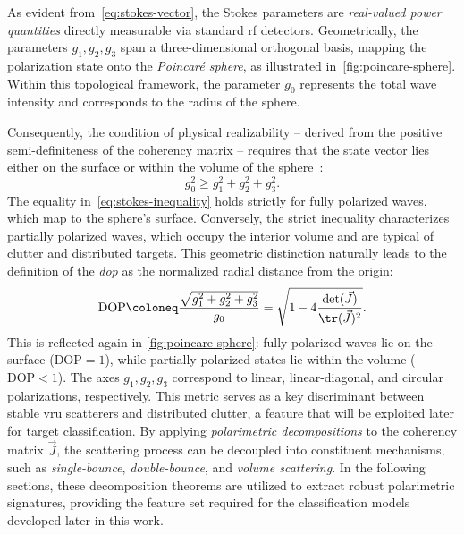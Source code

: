As evident from~\cref{eq:stokes-vector}, the Stokes parameters are \emph{real-valued power quantities} directly measurable via standard \gls{rf} detectors.
Geometrically, the parameters $g_1, g_2, g_3$ span a three-dimensional orthogonal basis, mapping the polarization state onto the \emph{Poincaré sphere}, as illustrated in~\cref{fig:poincare-sphere}.
Within this topological framework, the parameter $g_0$ represents the total wave intensity and corresponds to the radius of the sphere.

Consequently, the condition of physical realizability -- derived from the positive semi-definiteness of the coherency matrix -- requires that the state vector lies either on the surface or within the volume of the sphere~\parencite{cloudeReviewTargetDecomposition1996}:
\begin{equation}
    \label{eq:stokes-inequality}
    g_0^2 \geq g_1^2 + g_2^2 + g_3^2.
\end{equation}
The equality in~\cref{eq:stokes-inequality} holds strictly for fully polarized waves, which map to the sphere's surface.
Conversely, the strict inequality characterizes partially polarized waves, which occupy the interior volume and are typical of clutter and distributed targets.
This geometric distinction naturally leads to the definition of the \emph{\gls{dop}} as the normalized radial distance from the origin:
\begin{align}
    \text{DOP} \coloneq \frac{\sqrt{g_1^2 + g_2^2 + g_3^2}}{g_0} = \sqrt{1-4\frac{\det(\vec J)}{\tr(\vec J)^2}}.
\end{align}
This is reflected again in \cref{fig:poincare-sphere}: fully polarized waves lie on the surface ($\text{DOP} = 1$), while partially polarized states lie within the volume ($\text{DOP} < 1$).
The axes $g_1, g_2, g_3$ correspond to linear, linear-diagonal, and circular polarizations, respectively.
This metric serves as a key discriminant between stable \gls{vru} scatterers and distributed clutter, a feature that will be exploited later for target classification.
By applying \emph{polarimetric decompositions} to the coherency matrix $\vec J$, the scattering process can be decoupled into constituent mechanisms, such as \emph{single-bounce}, \emph{double-bounce}, and \emph{volume scattering}.
In the following sections, these decomposition theorems are utilized to extract robust polarimetric signatures, providing the feature set required for the classification models developed later in this work.

